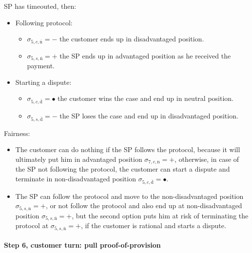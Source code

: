 \documentclass{ieeeaccess}
\begin{document}
SP has timeouted, then:

\begin{itemize}
\item
  Following protocol:

  \begin{itemize}
  
  \item
    \(\sigma_{5, c, \overline{\mathrm{n}}} = -\) the customer ends up in disadvantaged position.
  \item
    \(\sigma_{5, s, \overline{\mathrm{n}}} = +\) the SP ends up in
    advantaged position as he received the payment.
  \end{itemize}
\item
  Starting a dispute:

  \begin{itemize}
  
  \item
    \(\sigma_{5, c, \overline{\mathrm{d}}} = •\) the customer wins the
    case and end up in neutral position.
  \item
    \(\sigma_{5, s, \overline{\mathrm{d}}} = -\) the SP loses the case
    and end up in disadvantaged position.
  \end{itemize}
\end{itemize}

Fairness:

\begin{itemize}

\item
  The customer can do nothing if the SP follows the protocol, because it
  will ultimately put him in advantaged position
  \(\sigma_{7, c, \mathrm{n}} = +\), otherwise, in case of the SP not
  following the protocol, the customer can start a dispute and terminate
  in non-disadvantaged position
  \(\sigma_{5, c, \overline{\mathrm{d}}} = •\).
\item
  The SP can follow the protocol and move to the non-disadvantaged
  position \(\sigma_{5, s, \mathrm{n}} = +\), or not follow the protocol
  and also end up at non-disadvantaged position
  \(\sigma_{5, s, \overline{\mathrm{n}}} = +\), but the second option
  puts him at risk of terminating the protocol at
  \(\sigma_{5, s, \overline{\mathrm{n}}} = +\), if the customer is
  rational and starts a dispute.
\end{itemize}


\paragraph{Step 6, customer turn: pull proof-of-provision}\label{step-6-pull-proof-of-provision}
\end{document}
